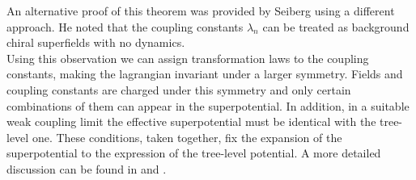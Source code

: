 An alternative proof of this theorem was provided by Seiberg \cite{Seiberg:1993vc} using a different approach.
He noted that the coupling constants $\lambda_n$ can be treated as background chiral superfields with no dynamics.
\\
Using this observation we can assign transformation laws to the coupling constants, making the lagrangian invariant under a larger symmetry.
Fields and coupling constants are charged under this symmetry and only certain combinations of them can appear in the superpotential.
In addition, in a suitable weak coupling limit the effective superpotential must be identical with the tree-level one.
These conditions, taken together, fix the expansion of the superpotential to the expression of the tree-level potential.
A more detailed discussion can be found in \cite{Seiberg:1994bp} and \cite{Intriligator:1995au}.






